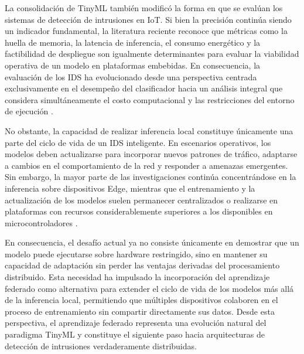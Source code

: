 \documentclass[journal,article,submit,moreauthors]{Definitions/mdpi}
\begin{document}
La consolidación de TinyML también modificó la forma en que se evalúan los sistemas de detección de intrusiones en IoT. Si bien la precisión continúa siendo un indicador fundamental, la literatura reciente reconoce que métricas como la huella de memoria, la latencia de inferencia, el consumo energético y la factibilidad de despliegue son igualmente determinantes para evaluar la viabilidad operativa de un modelo en plataformas embebidas. En consecuencia, la evaluación de los IDS ha evolucionado desde una perspectiva centrada exclusivamente en el desempeño del clasificador hacia un análisis integral que considera simultáneamente el costo computacional y las restricciones del entorno de ejecución \cite{Tekin2023,Amuthadevi2025,Dini2024,Heydari2024,HeydariSurvey2025,Bartoli2025,Banbury2020}.

No obstante, la capacidad de realizar inferencia local constituye únicamente una parte del ciclo de vida de un IDS inteligente. En escenarios operativos, los modelos deben actualizarse para incorporar nuevos patrones de tráfico, adaptarse a cambios en el comportamiento de la red y responder a amenazas emergentes. Sin embargo, la mayor parte de las investigaciones continúa concentrándose en la inferencia sobre dispositivos Edge, mientras que el entrenamiento y la actualización de los modelos suelen permanecer centralizados o realizarse en plataformas con recursos considerablemente superiores a los disponibles en microcontroladores \cite{Ficco2024,Ramadan2025,Ren2024}.

En consecuencia, el desafío actual ya no consiste únicamente en demostrar que un modelo puede ejecutarse sobre hardware restringido, sino en mantener su capacidad de adaptación sin perder las ventajas derivadas del procesamiento distribuido. Esta necesidad ha impulsado la incorporación del aprendizaje federado como alternativa para extender el ciclo de vida de los modelos más allá de la inferencia local, permitiendo que múltiples dispositivos colaboren en el proceso de entrenamiento sin compartir directamente sus datos. Desde esta perspectiva, el aprendizaje federado representa una evolución natural del paradigma TinyML y constituye el siguiente paso hacia arquitecturas de detección de intrusiones verdaderamente distribuidas.
\end{document}
